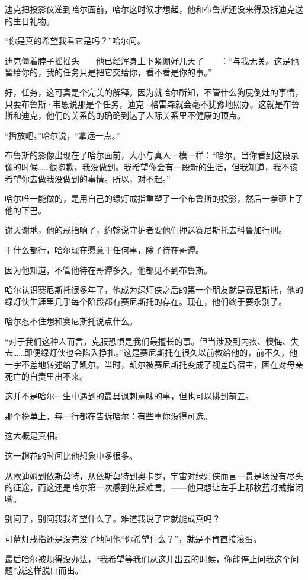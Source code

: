 \documentclass[../main]{subfiles}
\begin{document}
迪克把投影仪递到哈尔面前，哈尔这时候才想起，他和布鲁斯还没来得及拆迪克送的生日礼物。

“你是真的希望我看它是吗？”哈尔问。

迪克僵着脖子摇摇头——他已经浑身上下紧绷好几天了——：“与我无关。这是他留给你的，我的任务只是把它交给你，看不看是你的事。”

好，任务，这可真是个完美的解释。因为就哈尔所知，不管什么狗屁倒灶的事情，只要布鲁斯·韦恩说那是个任务，迪克·格雷森就会毫不犹豫地照办。这就是布鲁斯和迪克，他们的关系的的确确到达了人际关系里不健康的顶点。

“播放吧。”哈尔说，“拿远一点。”

布鲁斯的影像出现在了哈尔面前，大小与真人一模一样：“哈尔，当你看到这段录像的时候……很抱歉，我没做到。我希望你会有一段新的生活，但我知道，我不该希望你去做我没做到的事情。所以，对不起。”

哈尔唯一能做的，是用自己的绿灯戒指重塑了一个布鲁斯的投影，然后一拳砸上了他的下巴。

谢天谢地，他的戒指响了，约翰说守护者要他们押送赛尼斯托去科鲁加行刑。

干什么都行，哈尔现在愿意干任何事，除了待在哥谭。

因为他知道，不管他待在哥谭多久，他都见不到布鲁斯。

哈尔认识赛尼斯托很多年了，他成为绿灯侠之后的第一个朋友就是赛尼斯托，他的绿灯侠生涯里几乎每个阶段都有赛尼斯托的存在。现在，他们终于要永别了。

哈尔忍不住想和赛尼斯托说点什么。

“对于我们这种人而言，克服恐惧是我们最擅长的事。但当涉及到内疚、懊悔、失去……即便绿灯侠也会陷入挣扎。”这是赛尼斯托在很久以前教给他的，前不久，他一字不差地转述给了凯尔。当时，凯尔被赛尼斯托变成了视差的宿主，困在对母亲死亡的自责里出不来。

这并不是哈尔一生中遇到的最具讽刺意味的事，但也可以排到前五。

那个榜单上，每一行都在告诉哈尔：有些事你没得可选。

这大概是真相。

这一趟花的时间比他想象中多很多。

从欧迪姆到依斯莫特，从依斯莫特到奥卡罗，宇宙对绿灯侠而言一贯是场没有尽头的征途，而这还是哈尔第一次感到焦躁难言。——他只想让左手上那枚蓝灯戒指闭嘴。

别问了，别问我我希望什么了。难道我说了它就能成真吗？

可蓝灯戒指还是没完没了地问他“你希望什么？”，就是不肯直接滚蛋。

最后哈尔被烦得没办法，“我希望等我们从这儿出去的时候，你能停止问我这个问题”就这样脱口而出。
\end{document}

